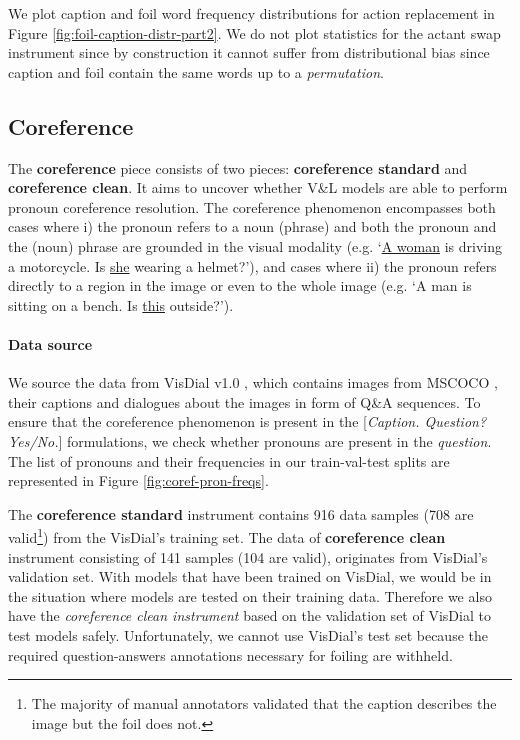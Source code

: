 \documentclass[11pt]{article}
\begin{document}
We plot caption and foil word frequency distributions for action replacement in Figure \ref{fig:foil-caption-distr-part2}. We do not plot statistics for the actant swap instrument since by construction it cannot suffer from distributional bias since caption and foil contain the same words up to a \emph{permutation}.

\subsection{Coreference}\label{app:coref}

The \textbf{coreference} piece consists of two pieces: \textbf{coreference standard} and \textbf{coreference clean}. It aims to uncover whether V\&L models are able to perform pronoun coreference resolution. The coreference phenomenon encompasses both cases where i) the pronoun refers to a noun (phrase) and both the pronoun and the (noun) phrase are grounded in the visual modality (e.g. `\underline{A woman} is driving a motorcycle. Is \underline{she} wearing a helmet?'), and cases where ii) the pronoun refers directly to a region in the image or even to the whole image (e.g. `A man is sitting on a bench. Is \underline{this} outside?').

\paragraph{Data source}
We source the data from VisDial v1.0 \cite{visdial}, which contains images from MSCOCO \cite{Lin-etal:2014:mscoco}, their captions and dialogues about the images in form of Q\&A sequences.
To ensure that the coreference phenomenon is present in the [\emph{Caption. Question? Yes/No.}] formulations, we check whether pronouns are present in the \emph{question}. The list of pronouns and their frequencies in our train-val-test splits are represented in Figure \ref{fig:coref-pron-freqs}.

The \textbf{coreference standard} instrument contains 916 data samples (708 are valid\footnote{The majority of manual annotators validated that the caption describes the image but the foil does not.}) from the VisDial's training set. The data of \textbf{coreference clean} instrument consisting of 141 samples (104 are valid), originates from VisDial's validation set. With models that have been trained on VisDial, we would be in the situation where models are tested on their training data. Therefore we also have the \emph{coreference clean instrument} based on the validation set of VisDial to test models safely. Unfortunately, we cannot use VisDial's test set because the required question-answers annotations necessary for foiling are withheld.
\end{document}
